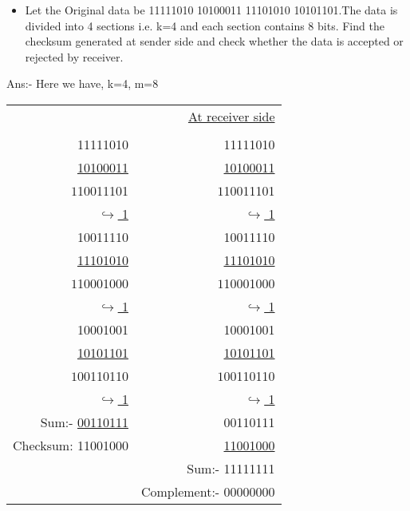 \documentclass[13pt]{article}
\begin{document}
    \Large \begin{itemize}
    \item \Large Let the Original data be 11111010 10100011 11101010 10101101.The data is divided into 4 sections i.e. k=4 and each section contains 8 bits. Find the checksum generated at sender side and check whether the data is accepted or rejected by receiver.
    \end{itemize}
    \item \Large Ans:- Here we have,
    \hspace{3mm} \Large k=4, m=8\\
    \setlength{\tabcolsep}{\center}
    \begin{tabular}{ r | r }
    \underline{{At sender side} & \underline{At receiver side}}\\\\
    11111010 & 11111010\\ \underline{10100011} & \underline{10100011}\\ \textcircled{$1$}10011101 & \textcircled{$1$}10011101 \\\underline{$\hookrightarrow$ \hspace{10mm} 1}  & \underline{$\hookrightarrow$ \hspace{10mm} 1} \\ 10011110 & 10011110 \\ \underline{11101010} & \underline{11101010} \\ \textcircled{$1$}10001000 & \textcircled{$1$}10001000 \\  \underline{$\hookrightarrow$ \hspace{10mm} 1} & \underline{$\hookrightarrow$ \hspace{10mm} 1} \\ 10001001 & 10001001 \\ \underline{10101101} & \underline{10101101} \\ \textcircled{$1$}00110110 &  \textcircled{$1$}00110110\\ \underline{$\hookrightarrow$ \hspace{10mm} 1} & \underline{$\hookrightarrow$ \hspace{10mm} 1} \\ Sum:- \underline{00110111} &  00110111\\Checksum: 11001000 &  \underline{11001000}\\& Sum:- 11111111\\ & Complement:- 00000000\\
    \end{tabular}
\end{document}
